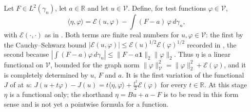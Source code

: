 \begin{definition}
Let $F \in L^2(\gamma_n)$, let $a \in \mathbb{R}$ and let $u \in \mathcal{V}$.
Define, for test functions $\varphi \in \mathcal{V}$,
\[
  \langle \eta, \varphi\rangle
    = \mathcal{E}(u, \varphi) - \int (F - a)\, \varphi \, d\gamma_n ,
\]
with $\mathcal{E}(\cdot,\cdot)$ as in .  Both terms are finite
real numbers for $u, \varphi \in \mathcal{V}$: the first by the Cauchy--Schwarz
bound $|\mathcal{E}(u,\varphi)| \leq \mathcal{E}(u)^{1/2}\mathcal{E}(\varphi)^{1/2}$
recorded in , the second because
$|\int(F-a)\varphi \, d\gamma_n| \leq \|F - a\mathbf{1}\|_2\|\varphi\|_2$.  Thus
$\eta$ is a linear functional on $\mathcal{V}$, bounded for the graph norm
$\|\varphi\|_{\mathcal{V}}^2 = \|\varphi\|_2^2 + \mathcal{E}(\varphi)$, and it is
completely determined by $u$, $F$ and $a$.  It is the first variation of the
functional $J$ of  at $u$:
$J(u + t\varphi) - J(u) = t\langle\eta,\varphi\rangle + \tfrac{t^2}{2}\mathcal{E}(\varphi)$
for every $t \in \mathbb{R}$.  At this stage $\eta$ is a functional only; the
shorthand $\eta = Bu + a - F$ is to be read in this form sense and is not yet a
pointwise formula for a function.
\end{definition}
